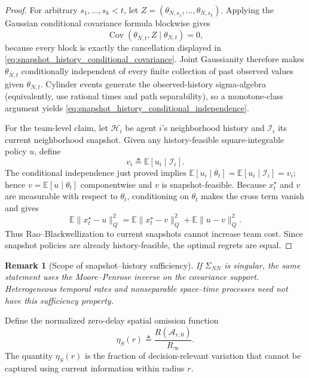 \documentclass[11pt]{article}
\newtheorem{remark}{Remark}
\begin{document}
\begin{proof}
For arbitrary $s_1,\ldots,s_k<t$, let
$Z=(\theta_{N,s_1},\ldots,\theta_{N,s_k})$. Applying the Gaussian conditional
covariance formula blockwise gives
\begin{equation}
\operatorname{Cov}(\theta_{\bar N,t},Z\mid\theta_{N,t})=0,
\end{equation}
because every block is exactly the cancellation displayed in
\eqref{eq:snapshot_history_conditional_covariance}. Joint Gaussianity therefore
makes $\theta_{\bar N,t}$ conditionally independent of every finite collection
of past observed values given $\theta_{N,t}$. Cylinder events generate the
observed-history sigma-algebra (equivalently, use rational times and path
separability), so a monotone-class argument yields
\eqref{eq:snapshot_history_conditional_independence}.

For the team-level claim, let $\mathcal H_i$ be agent $i$'s neighborhood
history and $\mathcal I_i$ its current neighborhood snapshot. Given any
history-feasible square-integrable policy $u$, define
\begin{equation}
v_i\triangleq\mathbb E[u_i\mid\mathcal I_i].
\end{equation}
The conditional independence just proved implies
$\mathbb E[u_i\mid\theta_t]=\mathbb E[u_i\mid\mathcal I_i]=v_i$; hence
$v=\mathbb E[u\mid\theta_t]$ componentwise and $v$ is snapshot-feasible.
Because $x_t^\star$ and $v$ are measurable with respect to $\theta_t$,
conditioning on $\theta_t$ makes the cross term vanish and gives
\begin{equation}
\mathbb E\|x_t^\star-u\|_Q^2
=\mathbb E\|x_t^\star-v\|_Q^2
+\mathbb E\|u-v\|_Q^2.
\end{equation}
Thus Rao--Blackwellization to current snapshots cannot increase team cost.
Since snapshot policies are already history-feasible, the optimal regrets are
equal.
\end{proof}

\begin{remark}[Scope of snapshot--history sufficiency]
If $\Sigma_{NN}$ is singular, the same statement uses the Moore--Penrose inverse
on the covariance support. Heterogeneous temporal rates and nonseparable
space--time processes need not have this sufficiency property.
\end{remark}

Define the normalized zero-delay spatial omission function
\begin{equation}
    \eta_S(r)
    \triangleq
    \frac{
        R(\mathcal{A}_{r,0})
    }{
        R_\infty
    }.
    \label{eq:eta_S_definition}
\end{equation}
The quantity $\eta_S(r)$ is the fraction of decision-relevant variation that
cannot be captured using current information within radius $r$.
\end{document}
